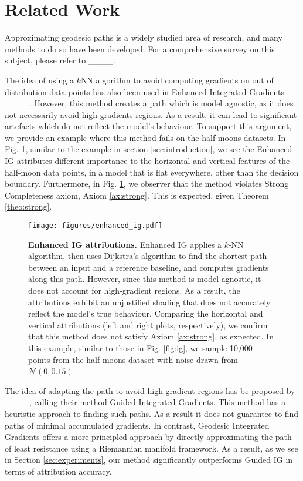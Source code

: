 \section{Related Work}
\label{sec:related_work}

Approximating geodesic paths is a widely studied area of research, and many methods to do so have been developed. For a comprehensive survey on this subject, please refer to ____.

The idea of using a $k$NN algorithm to avoid computing gradients on out of distribution data points has also been used in Enhanced Integrated Gradients ____. However, this method creates a path which is model agnostic, as it does not necessarily avoid high gradients regions. As a result, it can lead to significant artefacts which do not reflect the model's behaviour. To support this argument, we provide an example where this method fails on the half-moons datasets. In Fig. \ref{fig:enhanced_ig}, similar to the example in section \ref{sec:introduction}, we see the Enhanced IG attributes different importance to the horizontal and vertical features of the half-moon data points, in a model that is flat everywhere, other than the decision boundary. Furthermore, in Fig. \ref{fig:enhanced_ig}, we observer that the method violates Strong Completeness axiom, Axiom \ref{ax:strong}. This is expected, given Theorem \ref{theo:strong}.

\begin{figure}[t]
\vskip -0.2in
\begin{center}
\centerline{\texttt{[image: figures/enhanced\_ig.pdf]}}
\caption{\textbf{Enhanced IG attributions.} Enhanced IG applies a $k$-NN algorithm, then uses Dijkstra’s algorithm to find the shortest path between an input and a reference baseline, and computes gradients along this path. However, since this method is model-agnostic, it does not account for high-gradient regions. As a result, the attributions exhibit an unjustified shading that does not accurately reflect the model's true behaviour. Comparing the horizontal and vertical attributions (left and right plots, respectively), we confirm that this method does not satisfy Axiom \ref{ax:strong}, as expected. In this example, similar to those in Fig. \ref{fig:ig}, we sample 10,000 points from the half-moons dataset with noise drawn from  $\mathcal{N}(0, 0.15)$.}
\label{fig:enhanced_ig}
\end{center}
\vskip -0.2in
\end{figure}

The idea of adapting the path to avoid high gradient regions has be proposed by ____, calling their method Guided Integrated Gradients. This method has a heuristic approach to finding such paths. As a result it does not guarantee to find paths of minimal accumulated gradients. In contrast, Geodesic Integrated Gradients offers a more principled approach by directly approximating the path of least resistance using a Riemannian manifold framework. As a result, as we see in Section \ref{sec:experiments}, our method significantly outperforms Guided IG in terms of attribution accuracy.